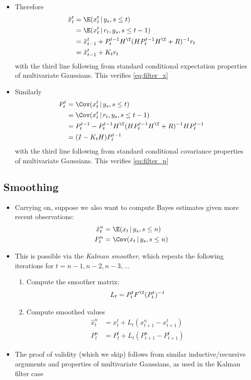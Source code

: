 \documentclass{article}
\begin{document}
\begin{itemize}
\item Therefore 
  \begin{align*}
  \hat{x}_t^t 
  & = \E(x_t^t \,|\, y_s, s \leq t) \\
  & = \E(x_t^t \,|\, r_t, y_s, s \leq t-1) \\
  &= \hat{x}_{t-1}^t + P_t^{t-1} H^\T (H P_t^{t-1} H^\T +  R)^{-1} r_t \\
  &= \hat{x}_{t-1}^t + K_t r_t
  \end{align*}
  with the third line following from standard conditional expectation properties 
  of multivariate Gaussians. This verifies \eqref{eq:filter_x}

\item Similarly 
  \begin{align*}
  P_t^t 
  & = \Cov(x_t^t \,|\, y_s, s \leq t) \\
  & = \Cov(x_t^t \,|\, r_t, y_s, s \leq t-1) \\
  &= P_t^{t-1} - P_t^{t-1} H^\T (H P_t^{t-1} H^\T +  R)^{-1} H P_t^{t-1} \\
  &= (I - K_t H) P_t^{t-1}
  \end{align*}
  with the third line following from standard conditional covariance properties
  of multivariate Gaussians. This verifies \eqref{eq:filter_p}
\end{itemize}

\subsection{Smoothing}

\begin{itemize}
\item Carrying on, suppose we also want to compute Bayes estimates given more
  recent observations:  
  \begin{align*}
  \hat{x}_t^n &= \E( x_t \,|\, y_s, s \leq n) \\
  P_t^n &= \Cov( x_t \,|\, y_s, s \leq n ) 
  \end{align*}

\item This is possible via the \emph{Kalman smoother}, which repeats the
  following iterations for $t = n-1,n-2,n-3,\dots$

\begin{enumerate}
\item Compute the smoother matrix: 
  \[
  L_t = P_t^t F^\T ( P_t^t ) ^{-1}
  \]

\item Compute smoothed values
  \begin{align*}
  \hat{x}_t^n &= x_t^t + L_t (x_{t+1}^n - x_{t+1}^t ) \\
  P_t^n &= P_t^t +L_t (P_{t+1}^n - P_{t+1}^t )
  \end{align*}
\end{enumerate}

\item The proof of validity (which we skip) follows from similar
  inductive/recursive arguments and properties of multivariate Gaussians, as
  used in the Kalman filter case 
\end{itemize}
\end{document}
